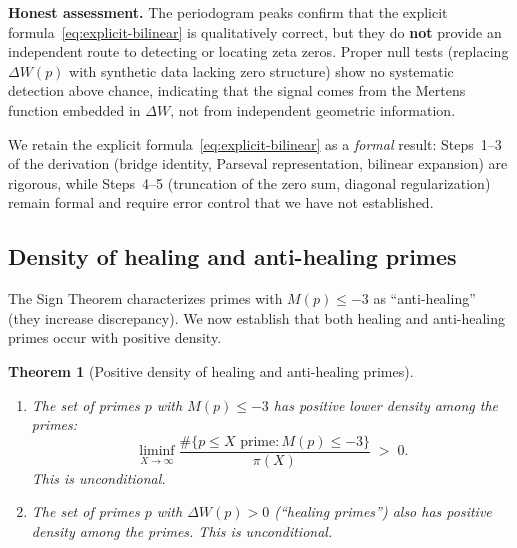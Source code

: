 \documentclass[11pt]{article}
\newtheorem{theorem}{Theorem}[section]
\theoremstyle{definition}
\begin{document}
\textbf{Honest assessment.}  The periodogram peaks confirm that the
explicit formula~\eqref{eq:explicit-bilinear} is qualitatively
correct, but they do \textbf{not} provide an independent route
to detecting or locating zeta zeros.  Proper null tests (replacing
$\Delta W(p)$ with synthetic data lacking zero structure) show
no systematic detection above chance, indicating that the signal
comes from the Mertens function embedded in $\Delta W$, not from
independent geometric information.

We retain the explicit formula~\eqref{eq:explicit-bilinear} as
a \emph{formal} result: Steps~1--3 of the derivation (bridge
identity, Parseval representation, bilinear expansion) are rigorous,
while Steps~4--5 (truncation of the zero sum, diagonal
regularization) remain formal and require error control that we
have not established.



\subsection{Density of healing and anti-healing primes}\label{sec:density}

The Sign Theorem characterizes primes with $M(p) \le -3$ as
``anti-healing'' (they increase discrepancy).  We now establish
that both healing and anti-healing primes occur with positive density.

\begin{theorem}[Positive density of healing and anti-healing primes]
\label{thm:density}
\begin{enumerate}[\upshape(a)]
  \item The set of primes $p$ with $M(p) \le -3$ has positive lower
    density among the primes:
    \[
      \liminf_{X \to \infty}
        \frac{\#\{p \le X \text{ prime} : M(p) \le -3\}}{\pi(X)}
      \;>\; 0.
    \]
    This is unconditional.
  \item The set of primes $p$ with $\Delta W(p) > 0$ (``healing primes'')
    also has positive density among the primes.  This is unconditional.
\end{enumerate}
\end{theorem}
\end{document}
